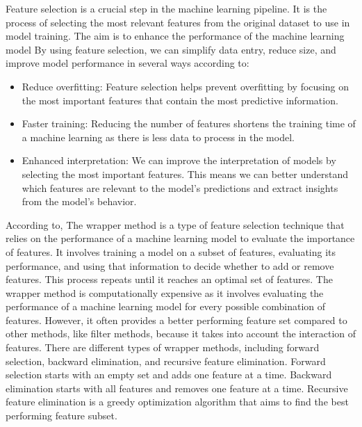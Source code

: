 \documentclass[12pt]{report}
\begin{document}
Feature selection is a crucial step in the machine learning pipeline. It is the
process of selecting the most relevant features from the original dataset to
use in model training. The aim is to enhance the performance of the machine
learning model By using feature selection, we can simplify data entry, reduce
size, and improve model performance in several ways according to\cite{guyon2003introduction}:

\begin{itemize}
    \item Reduce overfitting: Feature selection helps prevent overfitting by focusing on
          the most important features that contain the most predictive information.
    \item Faster training: Reducing the number of features shortens the training time of
          a machine learning as there is less data to process in the model.
    \item Enhanced interpretation: We can improve the interpretation of models by
          selecting the most important features. This means we can better understand
          which features are relevant to the model's predictions and extract insights
          from the model's behavior.

\end{itemize}

According to\cite{kohavi1997}, The wrapper method is a type of feature
selection technique that relies on the performance of a machine learning model
to evaluate the importance of features. It involves training a model on a
subset of features, evaluating its performance, and using that information to
decide whether to add or remove features. This process repeats until it reaches
an optimal set of features. The wrapper method is computationally expensive as
it involves evaluating the performance of a machine learning model for every
possible combination of features. However, it often provides a better
performing feature set compared to other methods, like filter methods, because
it takes into account the interaction of features. There are different types of
wrapper methods, including forward selection, backward elimination, and
recursive feature elimination. Forward selection starts with an empty set and
adds one feature at a time. Backward elimination starts with all features and
removes one feature at a time. Recursive feature elimination is a greedy
optimization algorithm that aims to find the best performing feature subset.\\
\end{document}
